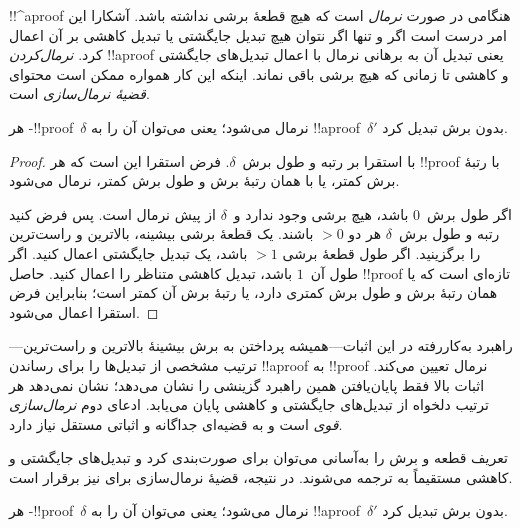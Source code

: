 \documentclass[../../../include/open-logic-section]{subfiles}
\begin{document}


!!^a{proof} هنگامی در صورت \emph{نرمال} است که هیچ قطعهٔ برشی نداشته
باشد. آشکارا این امر درست است اگر و تنها اگر نتوان هیچ تبدیل جایگشتی یا
تبدیل کاهشی بر آن اعمال کرد. \emph{نرمال‌کردن} !!a{proof} یعنی تبدیل آن
به برهانی نرمال با اعمال تبدیل‌های جایگشتی و کاهشی تا زمانی که هیچ برشی
باقی نماند. اینکه این کار همواره ممکن است محتوای \emph{قضیهٔ
نرمال‌سازی} است.

\begin{thm}
هر -!!{proof}~$\delta$ نرمال می‌شود؛ یعنی می‌توان آن را به
!!a{proof}~$\delta'$ بدون برش تبدیل کرد.
\end{thm}

\begin{proof}
  با استقرا بر رتبه و طول برش~$\delta$. فرض استقرا این است که هر
  !!{proof} با رتبهٔ برش کمتر، یا با همان رتبهٔ برش و طول برش کمتر،
  نرمال می‌شود.

  اگر طول برش~$0$ باشد، هیچ برشی وجود ندارد و~$\delta$ از پیش نرمال
  است. پس فرض کنید رتبه و طول برش~$\delta$ هر دو $>0$ باشند. یک قطعهٔ
  برشی بیشینه، بالاترین و راست‌ترین را برگزینید. اگر طول قطعهٔ برشی
  $>1$ باشد، یک تبدیل جایگشتی اعمال کنید. اگر طول آن~$1$ باشد، تبدیل
  کاهشی متناظر را اعمال کنید. حاصل !!{proof} تازه‌ای است که یا همان
  رتبهٔ برش و طول برش کمتری دارد، یا رتبهٔ برش آن کمتر است؛ بنابراین
  فرض استقرا اعمال می‌شود.
\end{proof}

راهبرد به‌کاررفته در این اثبات---همیشه پرداختن به برش بیشینهٔ بالاترین
و راست‌ترین---ترتیب مشخصی از تبدیل‌ها را برای رساندن !!a{proof} به
!!{proof} نرمال تعیین می‌کند. اثبات بالا فقط پایان‌یافتن همین راهبرد
گزینشی را نشان می‌دهد؛ نشان نمی‌دهد هر ترتیب دلخواه از تبدیل‌های
جایگشتی و کاهشی پایان می‌یابد. ادعای دوم \emph{نرمال‌سازی قوی} است و
به قضیه‌ای جداگانه و اثباتی مستقل نیاز دارد.

تعریف قطعه و برش را به‌آسانی می‌توان برای  صورت‌بندی کرد و
تبدیل‌های جایگشتی و کاهشی  مستقیماً به  ترجمه
می‌شوند. در نتیجه، قضیهٔ نرمال‌سازی برای  نیز برقرار است.

\begin{thm}
هر -!!{proof}~$\delta$ نرمال می‌شود؛ یعنی می‌توان آن را به
!!a{proof}~$\delta'$ بدون برش تبدیل کرد.
\end{thm}
\end{document}
